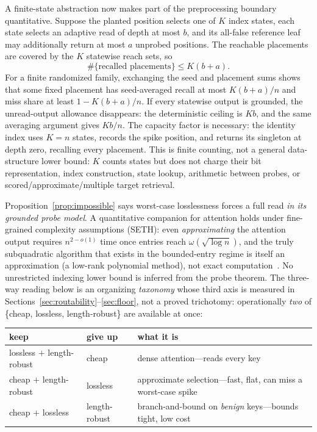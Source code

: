 \documentclass[11pt]{article}
\numberwithin{equation}{section}
\begin{document}
A finite-state abstraction now makes part of the preprocessing boundary quantitative. Suppose the planted
position selects one of $K$ index states, each state selects an adaptive read of depth at most $b$, and its
all-false reference leaf may additionally return at most $a$ unprobed positions. The reachable placements
are covered by the $K$ statewise reach sets, so
\begin{equation}\label{eq:index-capacity}
\#\{\text{recalled placements}\}\le K(b+a).
\end{equation}
For a finite randomized family, exchanging the seed and placement sums shows that some fixed placement has
seed-averaged recall at most $K(b+a)/n$ and miss share at least $1-K(b+a)/n$. If every statewise output is
grounded, the unread-output allowance disappears: the deterministic ceiling is $Kb$, and the same averaging
argument gives $Kb/n$. The capacity factor is necessary: the identity index uses $K=n$
states, records the spike position, and returns its singleton at depth zero, recalling every placement. This
is finite counting, not a general data-structure lower bound: $K$ counts states but does not charge their bit
representation, index construction, state lookup, arithmetic between probes, or scored/approximate/multiple
target retrieval.

Proposition~\ref{prop:impossible} says worst-case losslessness forces a full read \emph{in its grounded probe
model}. A quantitative companion for attention holds under fine-grained complexity assumptions (SETH): even
\emph{approximating} the attention
output requires $n^{2-o(1)}$ time once entries reach $\omega(\sqrt{\log n})$, and the truly subquadratic
algorithm that exists in the bounded-entry regime is itself an approximation (a low-rank polynomial method),
not exact computation~\cite{alman2023}. No unrestricted indexing lower bound is inferred from the probe
theorem. The three-way reading below is an organizing \emph{taxonomy} whose third axis
is measured in Sections~\ref{sec:routability}--\ref{sec:floor}, not a proved trichotomy: operationally \emph{two}
of \{cheap, lossless, length-robust\} are available at once:

\begin{center}
\begin{tabular}{@{}lll@{}}
\toprule
keep & give up & what it is\\
\midrule
lossless $+$ length-robust & cheap & dense attention---reads every key\\
cheap $+$ length-robust & lossless & approximate selection---fast, flat, can miss a worst-case spike\\
cheap $+$ lossless & length-robust & branch-and-bound on \emph{benign} keys---bounds tight, low cost\\
\bottomrule
\end{tabular}
\end{center}
\end{document}
